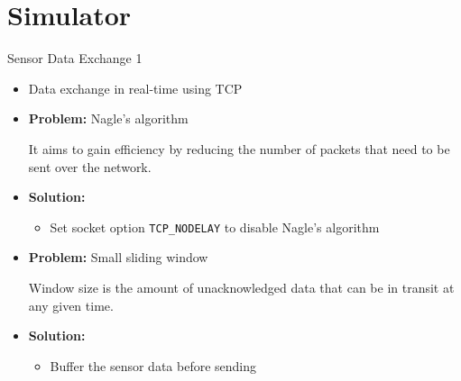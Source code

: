 \section{Simulator}

\begin{frame}{Sensor Data Exchange 1}
\begin{itemize}

\item Data exchange in real-time using TCP
\vspace{12pt} 

\item \textbf{Problem:} Nagle's algorithm

It aims to gain efficiency by reducing the number of packets that need to be sent over the network. 

\item \textbf{Solution:} 
    \begin{itemize}
    \item Set socket option \texttt{TCP\_NODELAY} to disable Nagle's algorithm
    \end{itemize}
\vspace{12pt} 
    
\item \textbf{Problem:} Small sliding window

Window size is the amount of unacknowledged data that can be in transit at any given time.
\item \textbf{Solution:} 
    \begin{itemize}
    \item Buffer the sensor data before sending
    \end{itemize}
\end{itemize}
\end{frame}

